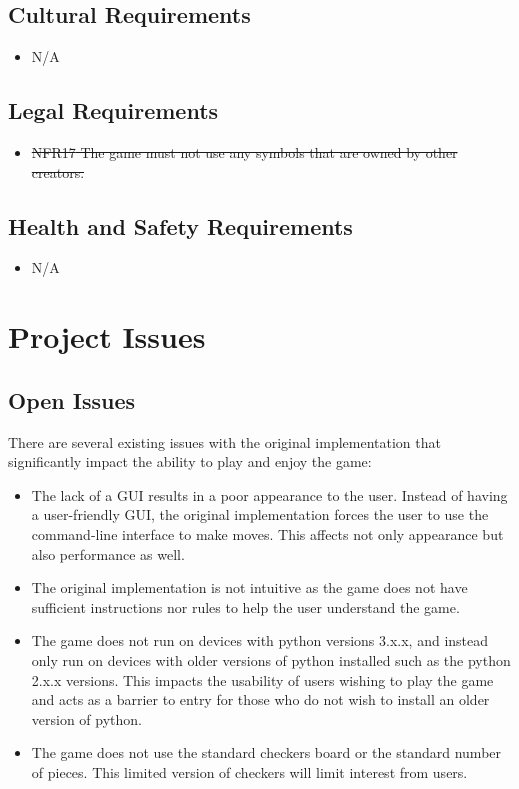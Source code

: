 \documentclass[12pt, titlepage]{article}
\begin{document}
\subsection{Cultural Requirements}
\begin{itemize}
    \item N/A
\end{itemize}

\subsection{Legal Requirements}
\begin{itemize}
    \item {\color{blue}\st{ {NFR17} The game must not use any symbols that are owned by other creators. }}
\end{itemize}

\subsection{Health and Safety Requirements}
\begin{itemize}
    \item N/A
\end{itemize}
\section{Project Issues}

\subsection{Open Issues}
There are several existing issues with the original implementation that significantly impact the ability to play and enjoy the game:
\begin{itemize}
\item The lack of a GUI results in a poor appearance to the user. Instead of having a user-friendly GUI, the original implementation forces the user to use the command-line interface to make moves. This affects not only appearance but also performance as well.
\item The original implementation is not intuitive as the game does not have sufficient instructions nor rules to help the user understand the game.
\item The game does not run on devices with python versions 3.x.x, and instead only run on devices with older versions of python installed such as the python 2.x.x versions. This impacts the usability of users wishing to play the game and acts as a barrier to entry for those who do not wish to install an older version of python.
\item The game does not use the standard checkers board or the standard number of pieces. This limited version of checkers will limit interest from users.
\end{itemize}
\end{document}
